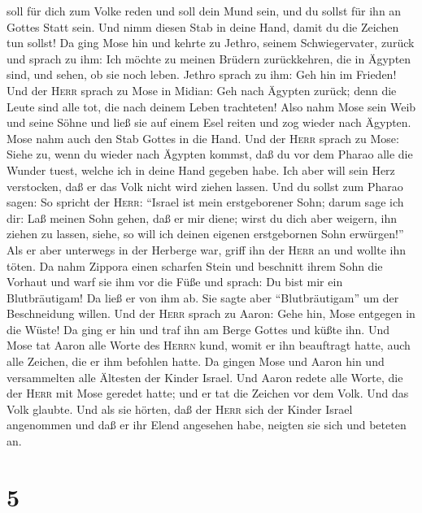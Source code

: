 soll für dich zum Volke reden und soll dein Mund sein, und du sollst für
ihn an Gottes Statt sein.  Und nimm diesen Stab in deine
Hand, damit du die Zeichen tun sollst!  Da ging Mose hin
und kehrte zu Jethro, seinem Schwiegervater, zurück und sprach zu ihm:
Ich möchte zu meinen Brüdern zurückkehren, die in Ägypten sind, und
sehen, ob sie noch leben. Jethro sprach zu ihm: Geh hin im Frieden!
 Und der \textsc{Herr} sprach zu Mose in Midian: Geh nach
Ägypten zurück; denn die Leute sind alle tot, die nach deinem Leben
trachteten!  Also nahm Mose sein Weib und seine Söhne und
ließ sie auf einem Esel reiten und zog wieder nach Ägypten. Mose nahm
auch den Stab Gottes in die Hand.  Und der \textsc{Herr}
sprach zu Mose: Siehe zu, wenn du wieder nach Ägypten kommst, daß du vor
dem Pharao alle die Wunder tuest, welche ich in deine Hand gegeben habe.
Ich aber will sein Herz verstocken, daß er das Volk nicht wird ziehen
lassen.  Und du sollst zum Pharao sagen: So spricht der
\textsc{Herr}: ``Israel ist mein erstgeborener Sohn; 
darum sage ich dir: Laß meinen Sohn gehen, daß er mir diene; wirst du
dich aber weigern, ihn ziehen zu lassen, siehe, so will ich deinen
eigenen erstgebornen Sohn erwürgen!''  Als er aber
unterwegs in der Herberge war, griff ihn der \textsc{Herr} an und wollte
ihn töten.  Da nahm Zippora einen scharfen Stein und
beschnitt ihrem Sohn die Vorhaut und warf sie ihm vor die Füße und
sprach: Du bist mir ein Blutbräutigam!  Da ließ er von
ihm ab. Sie sagte aber ``Blutbräutigam'' um der Beschneidung willen.
 Und der \textsc{Herr} sprach zu Aaron: Gehe hin, Mose
entgegen in die Wüste! Da ging er hin und traf ihn am Berge Gottes und
küßte ihn.  Und Mose tat Aaron alle Worte des
\textsc{Herrn} kund, womit er ihn beauftragt hatte, auch alle Zeichen,
die er ihm befohlen hatte.  Da gingen Mose und Aaron hin
und versammelten alle Ältesten der Kinder Israel.  Und
Aaron redete alle Worte, die der \textsc{Herr} mit Mose geredet hatte;
und er tat die Zeichen vor dem Volk.  Und das Volk
glaubte. Und als sie hörten, daß der \textsc{Herr} sich der Kinder
Israel angenommen und daß er ihr Elend angesehen habe, neigten sie sich
und beteten an.

\hypertarget{section-4}{%
\section{5}\label{section-4}}

